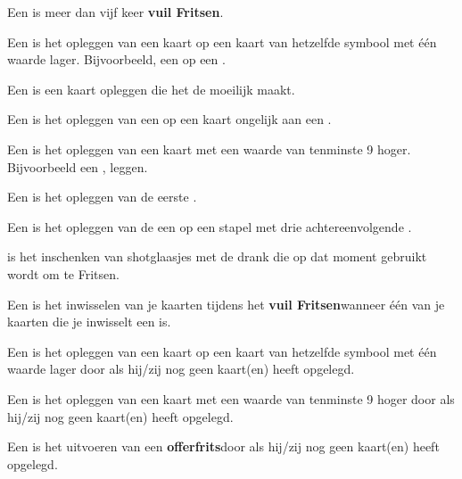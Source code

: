 
\item Een  is meer dan vijf keer \textbf{vuil Fritsen}\footnotemark[1].

\item Een  is het opleggen van een kaart op een kaart van hetzelfde symbool met \'e\'en waarde lager. Bijvoorbeeld, een  op een .

\item Een  is een kaart opleggen die het de \andereSpelers moeilijk maakt.

\item Een  is het opleggen van een  op een kaart ongelijk aan een .

\item Een  is het opleggen van een kaart met een waarde van tenminste 9 hoger. Bijvoorbeeld een ,  leggen.

\item Een  is het opleggen van de eerste .

\item Een  is het opleggen van de een  op een stapel met drie achtereenvolgende .

\item {} is het inschenken van shotglaasjes met de drank die op dat moment gebruikt wordt om te Fritsen.

\item Een  is het inwisselen van je kaarten tijdens het \textbf{vuil Fritsen}\footnotemark[1] wanneer één van je kaarten die je inwisselt een  is. 

\item Een  is het opleggen van een kaart op een kaart van hetzelfde symbool met \'e\'en waarde lager door \Willem als hij/zij nog geen kaart(en) heeft opgelegd.

\item Een  is het opleggen van een kaart met een waarde van tenminste 9 hoger door \Willem als hij/zij nog geen kaart(en) heeft opgelegd.

\item Een  is het uitvoeren van een \textbf{offerfrits}\footnotemark[2] door \Willem als hij/zij nog geen kaart(en) heeft opgelegd.

